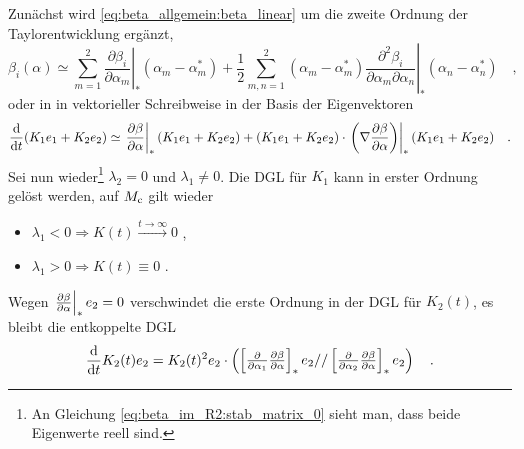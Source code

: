 	Zunächst wird \eqref{eq:beta_allgemein:beta_linear} um die zweite 
	Ordnung der Taylorentwicklung ergänzt,
     \begin{equation}
     \beta_i(\alpha) \simeq \sum\limits_{m=1}^2 \left. \frac{\partial \beta_i
     }{\partial
      \alpha_m}\right|_* \left(\alpha_m-\alpha^*_m\right) + \frac12 
      \sum\limits_{m,n=1}^2 
       \left(\alpha_m-\alpha^*_m\right)
      \left.\frac{\partial^2 \beta_i}{\partial\alpha_m \partial\alpha_n}
      \right|_* \left(\alpha_n-\alpha^*_n\right) \quad ,
     \end{equation}
     oder in in vektorieller Schreibweise in der Basis der Eigenvektoren
     \begin{equation}
     \frac{\text{d}}{\text{d} t} (K_1e_1+K_2e_2)\simeq\left.\frac{\partial \beta}{\partial \alpha}\right|_* (K_1e_1+K_2e_2) +
     (K_1e_1+K_2e_2) \cdot \left.\left(\nabla \frac{\partial \beta}{\partial \alpha} \right)\right|_*
      (K_1e_1+K_2e_2) \quad .
     \end{equation}
     Sei nun wieder\footnote{An Gleichung \eqref{eq:beta_im_R2:stab_matrix_0} 
     sieht man, dass beide Eigenwerte reell sind.} $\lambda_2=0$ und 
     $\lambda_1\neq 0$. Die DGL für $K_1$ kann in erster Ordnung gelöst 
     werden, auf $M_\text{c}$ gilt wieder 
     \begin{itemize}
     	\item $\lambda_1<0 \Rightarrow K(t)
     		\overset{t\to \infty}{\longrightarrow} 0$ ,
     	\item $\lambda_1>0 \Rightarrow K(t) \equiv 0$ .
	\end{itemize}
	Wegen $\left.\frac{\partial \beta}{\partial \alpha}\right|_* e_2=0$ verschwindet die erste Ordnung in der DGL für 
	$K_2(t)$, es bleibt die entkoppelte DGL
	\begin{equation}
		\frac{\text{d}}{\text{d} t} K_2(t) e_2 = K_2(t)^2 e_2 \cdot \begin{pmatrix}
		\left[\frac{\partial}{\partial \alpha_1} \frac{\partial \beta}{\partial \alpha} \right]_* e_2 //
		\left[\frac{\partial}{\partial \alpha_2} \frac{\partial \beta}{\partial \alpha} \right]_* e_2		
		\end{pmatrix} \quad .
	\end{equation}	 	
	
	
	
      
